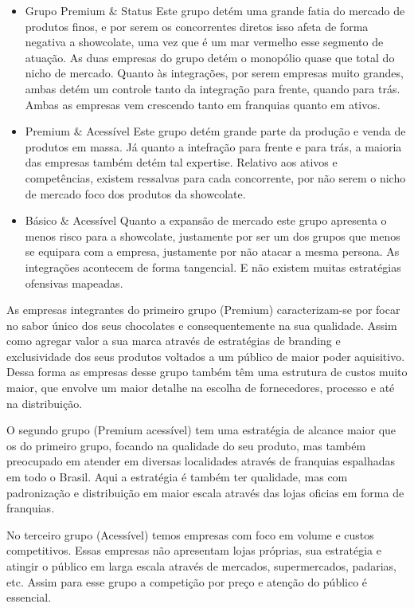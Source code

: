 \documentclass[
	12pt,				%
	openright,			%
	oneside,			%
	a4paper,			%
	english,			%
	french,				%
	spanish,			%
	brazil				%
	]{abntex2}
\begin{document}
\begin{itemize}
\item Grupo Premium $\&$ Status
\subitem Este grupo detém uma grande fatia do mercado de produtos finos, e por serem os concorrentes diretos isso afeta de forma negativa a showcolate, uma vez que é um mar vermelho esse segmento de atuação. As duas empresas do grupo detém o monopólio quase que total do nicho de mercado.
\subitem Quanto às integrações, por serem empresas muito grandes, ambas detém um controle tanto da integração para frente, quando para trás.
\subitem Ambas as empresas vem crescendo tanto em franquias quanto em ativos.
\item Premium $\&$ Acessível
\subitem Este grupo detém grande parte da produção e venda de produtos em massa.
\subitem Já quanto a intefração para frente e para trás, a maioria das empresas também detém tal expertise.
\subitem Relativo aos ativos e competências, existem ressalvas para cada concorrente, por não serem o nicho de mercado foco dos produtos da showcolate.
\item Básico $\&$ Acessível
\subitem Quanto a expansão de mercado este grupo apresenta o menos risco para a showcolate, justamente por ser um dos grupos que menos se equipara com a empresa, justamente por não atacar a mesma persona.
\subitem As integrações acontecem de forma tangencial.
\subitem E não existem muitas estratégias ofensivas mapeadas.
\end{itemize}

As empresas integrantes do primeiro grupo (Premium) caracterizam-se por focar no sabor único dos seus chocolates e consequentemente na sua qualidade. Assim como agregar valor a sua marca através de estratégias de branding e exclusividade dos seus produtos voltados a um público de maior poder aquisitivo. Dessa forma as empresas desse grupo também têm uma estrutura de custos muito maior, que envolve um maior detalhe na escolha de fornecedores, processo e até na distribuição.

O segundo grupo (Premium acessível) tem uma estratégia de alcance maior que os do primeiro grupo, focando na qualidade do seu produto, mas também preocupado em atender em diversas localidades através de franquias espalhadas em todo o Brasil. Aqui a estratégia é também ter qualidade, mas com padronização e distribuição em maior escala através das lojas oficias em forma de franquias.

No terceiro grupo (Acessível) temos empresas com foco em volume e custos competitivos. Essas empresas não apresentam lojas próprias, sua estratégia e atingir o público em larga escala através de mercados, supermercados, padarias, etc. Assim para esse grupo a competição por preço e atenção do público é essencial.
\end{document}
